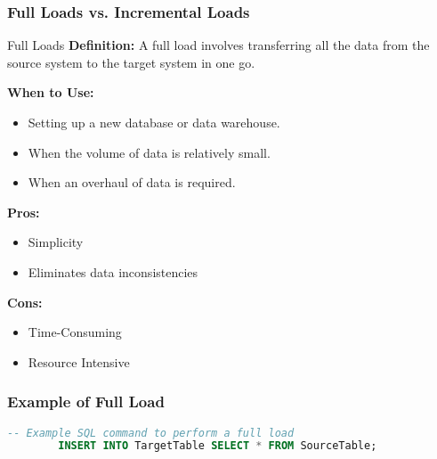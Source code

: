 \documentclass[aspectratio=169]{beamer}
\begin{document}
\begin{frame}[fragile]
    \frametitle{Full Loads vs. Incremental Loads}
    \begin{block}{Full Loads}
        \textbf{Definition:} A full load involves transferring all the data from the source system to the target system in one go.
    
        \textbf{When to Use:}
        \begin{itemize}
            \item Setting up a new database or data warehouse.
            \item When the volume of data is relatively small.
            \item When an overhaul of data is required.
        \end{itemize}
        
        \textbf{Pros:}
        \begin{itemize}
            \item Simplicity
            \item Eliminates data inconsistencies
        \end{itemize}
        
        \textbf{Cons:}
        \begin{itemize}
            \item Time-Consuming
            \item Resource Intensive
        \end{itemize}
    \end{block}
\end{frame}

\begin{frame}[fragile]
    \frametitle{Example of Full Load}
    \begin{lstlisting}[language=SQL]
        -- Example SQL command to perform a full load 
        INSERT INTO TargetTable SELECT * FROM SourceTable;
    \end{lstlisting}
\end{frame}
\end{document}
